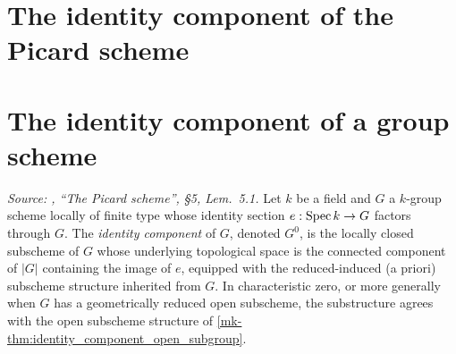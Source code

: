 \section{The identity component of the Picard scheme}
\label{mk-chap:Picard_IdentityComponent}
\providecommand{\connComp}{\operatorname{Comp}}

\section{The identity component of a group scheme}
\label{mk-sec:identity_component_abstract}


\begin{definition}\label{mk-def:identity_component_group_scheme}
  \leanok

  \textit{Source: \cite{kleiman-picard}, ``The Picard scheme'', \S 5, Lem.~5.1.}
  Let \(k\) be a field and \(G\) a \(k\)-group scheme locally of finite type
  whose identity section \(e : \operatorname{Spec} k \to G\) factors through \(G\). The
  \emph{identity component} of \(G\), denoted \(G^0\), is the locally closed
  subscheme of \(G\) whose underlying topological space is the connected
  component of \(|G|\) containing the image of \(e\), equipped with the
  reduced-induced (a priori) subscheme structure inherited from \(G\).
  In characteristic zero, or more generally when \(G\) has a
  geometrically reduced open subscheme, the substructure agrees with
  the open subscheme structure of \ref{mk-thm:identity_component_open_subgroup}.
\end{definition}

